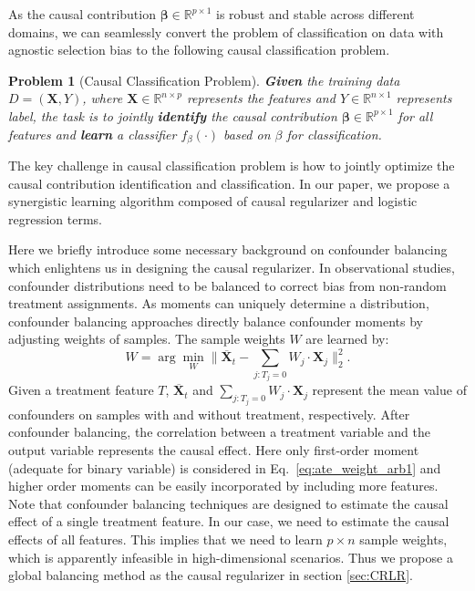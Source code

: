 \documentclass[sigconf]{acmart}
\newtheorem{problem}{Problem}
\begin{document}
As the causal contribution $\bm{\beta} \in \mathbb{R}^{p\times 1}$ is robust and stable across different domains, we can seamlessly convert the problem of classification on data with agnostic selection bias to the following causal classification problem.

\begin{problem}[Causal Classification Problem]
\textbf{Given} the training data $D=(\bm{X},Y)$, where $\bm{X} \in \mathbb{R}^{n\times p}$ represents the features and $Y \in \mathbb{R}^{n\times 1}$ represents label, the task is to jointly \textbf{identify} the causal contribution $\bm{\beta} \in \mathbb{R}^{p\times 1}$ for all features and \textbf{learn} a classifier $f_{\beta}(\cdot)$ based on $\beta$ for classification.
\end{problem}

The key challenge in causal classification problem is how to jointly optimize the causal contribution identification and classification.
In our paper, we propose a synergistic learning algorithm composed of causal regularizer and logistic regression terms.

Here we briefly introduce some necessary background on confounder balancing which enlightens us in designing the causal regularizer.
In observational studies, confounder distributions need to be balanced to correct bias from non-random treatment assignments.
As moments can uniquely determine a distribution, confounder balancing approaches directly balance confounder moments by adjusting weights of samples\cite{hainmueller2011entropy,athey2016approximate,Kuang2017Estimating}.
The sample weights $W$ are learned by:
\begin{equation}
    \label{eq:ate_weight_arb1}
    {W = \arg \min_{W} \|\overline{\bm{X}}_t - \sum_{j:T_j=0}W_j\cdot \bm{X}_j\|^{2}_2.}
\end{equation}
Given a treatment feature $T$, $\overline{\bm{X}}_t$ and $\sum_{j:T_j=0}W_j\cdot \bm{X}_j$ represent the mean value of confounders on samples with and without treatment, respectively.
After confounder balancing, the correlation between a treatment variable and the output variable represents the causal effect.
Here only first-order moment (adequate for binary variable) is considered in Eq.~\ref{eq:ate_weight_arb1} and higher order moments can be easily incorporated by including more features.
Note that confounder balancing techniques are designed to estimate the causal effect of a single treatment feature.
In our case, we need to estimate the causal effects of all features.
This implies that we need to learn $p \times n$ sample weights, which is apparently infeasible in high-dimensional scenarios.
Thus we propose a global balancing method as the causal regularizer in section \ref{sec:CRLR}.
\end{document}
